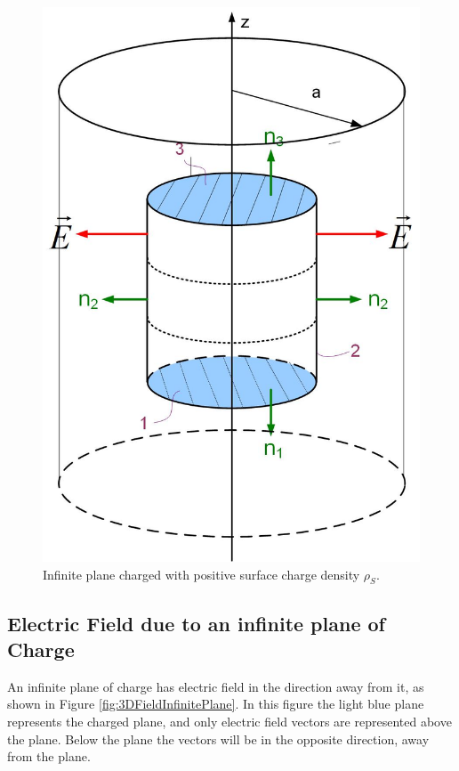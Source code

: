 \documentclass{ximera}
\begin{document}
\begin{figure}[htbp]
\begin{center}
\includegraphics[scale=0.3]{../jpg/gausslawwireInside.jpg}
\end{center}
\caption{Infinite plane charged with positive surface charge density $\rho_S$.}
\label{fig:gaussLineIn}
\end{figure}


\subsection{Electric Field due to an infinite plane of Charge}

An infinite plane of charge has electric field in the direction away from it, as shown in Figure \ref{fig:3DFieldInfinitePlane}. In this figure the light blue plane represents the charged plane, and only electric field vectors are represented above the plane. Below the plane the vectors will be in the opposite direction, away from the plane. 
\end{document}
